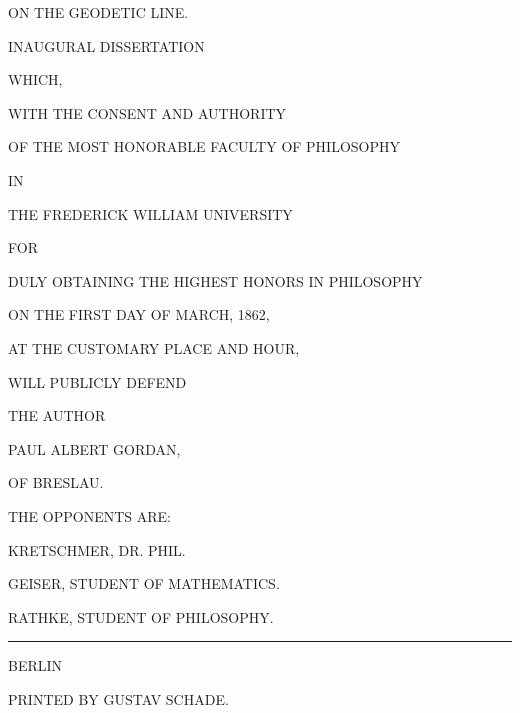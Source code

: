 \begin{titlepage}
\centering
{\LARGE ON THE GEODETIC LINE.\par}\GordanOrnament
\vspace{1.4em}
{\large INAUGURAL DISSERTATION\par}
\vspace{0.6em}
WHICH,\par
\vspace{0.6em}
WITH THE CONSENT AND AUTHORITY\par
\vspace{0.6em}
OF THE MOST HONORABLE FACULTY OF PHILOSOPHY\par
IN\par
THE FREDERICK WILLIAM UNIVERSITY\par
\vspace{0.6em}
FOR\par
\vspace{0.6em}
DULY OBTAINING THE HIGHEST HONORS IN PHILOSOPHY\par
\vspace{0.9em}
ON THE FIRST DAY OF MARCH, 1862,\par
AT THE CUSTOMARY PLACE AND HOUR,\par
\vspace{0.8em}
WILL PUBLICLY DEFEND\par
\vspace{0.8em}
THE AUTHOR\par
\vspace{0.8em}
{\large PAUL ALBERT GORDAN,\par}
OF BRESLAU.\par
\vspace{1.2em}
THE OPPONENTS ARE:\par
\vspace{0.5em}
KRETSCHMER, DR. PHIL.\par
GEISER, STUDENT OF MATHEMATICS.\par
RATHKE, STUDENT OF PHILOSOPHY.\par
\vfill\rule{0.72\textwidth}{0.35pt}\par\vspace{0.7em}
BERLIN\par
PRINTED BY GUSTAV SCHADE.\par
\end{titlepage}
